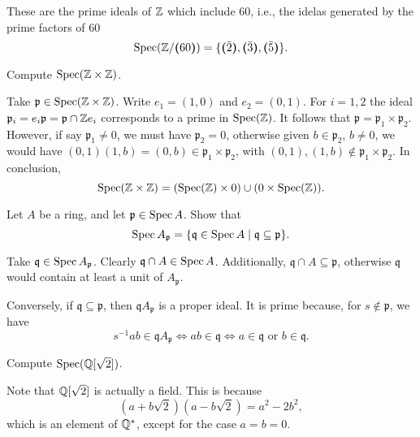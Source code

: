 \begin{solution}
    These are the prime ideals of $\mathbb{Z}$ which include $60$, i.e., the idelas generated by the prime factors of $60$
    $$
        \operatorname{Spec}(\mathbb{Z}/\textrm{\boldmath$($}60\textrm{\boldmath$)$})=\{\textrm{\boldmath$($}\bar 2\textrm{\boldmath$)$}, \textrm{\boldmath$($}\bar 3\textrm{\boldmath$)$},\textrm{\boldmath$($}\bar 5\textrm{\boldmath$)$}\}.
    $$
\end{solution}

\begin{exr}
    Compute\/ $\operatorname{Spec}(\mathbb{Z}\times\mathbb{Z})$. 
\end{exr}

\begin{solution}
    Take $\mathfrak p\in\operatorname{Spec}(\mathbb{Z}\times\mathbb{Z})$. Write $e_1=(1,0)$ and $e_2=(0,1)$. For $i=1,2$ the ideal $\mathfrak p_i=e_i\mathfrak p = \mathfrak p\cap\mathbb{Z} e_i$ corresponds to a prime in $\operatorname{Spec}(\mathbb{Z})$. It follows that $\mathfrak p=\mathfrak p_1\times\mathfrak p_2$. However, if say $\mathfrak p_1\ne0$, we must have $\mathfrak p_2=0$, otherwise given $b\in\mathfrak p_2$, $b\ne0$, we would have $(0,1)(1,b)=(0,b)\in\mathfrak p_1\times\mathfrak p_2$, with $(0,1), (1,b)\notin\mathfrak p_1\times\mathfrak p_2$. In conclusion,
    $$
        \operatorname{Spec}(\mathbb{Z}\times\mathbb{Z}) = (\operatorname{Spec}(\mathbb{Z})\times 0)\cup(0\times\operatorname{Spec}(\mathbb{Z})).
    $$
\end{solution}

\begin{exr}
    Let\/ $A$ be a ring, and let\/ $\mathfrak p \in \operatorname{Spec} A$. Show that
    $$
        \operatorname{Spec} A_{\mathfrak p} = \{\mathfrak q \in \operatorname{Spec} A
            \mid \mathfrak q \subseteq \mathfrak p\}.
    $$
\end{exr}

\begin{solution}
    Take $\mathfrak q\in\operatorname{Spec} A_{\mathfrak p}$. Clearly $\mathfrak q\cap A\in\operatorname{Spec} A$. Additionally, $\mathfrak q\cap A\subseteq\mathfrak p$, otherwise $\mathfrak q$ would contain at least a unit of $A_{\mathfrak p}$.

    Conversely, if $\mathfrak q\subseteq\mathfrak p$, then $\mathfrak qA_{\mathfrak p}$ is a proper ideal. It is prime because, for $s\notin\mathfrak p$, we have
    $$
        s^{-1}ab\in\mathfrak qA_{\mathfrak p}
            \iff ab\in\mathfrak q
            \iff a\in\mathfrak q\text{ or }b\in\mathfrak q.
    $$
\end{solution}

\begin{exr}
    Compute $\operatorname{Spec}(\mathbb{Q}[\sqrt2])$.
\end{exr}

\begin{solution}
    Note that $\mathbb{Q}[\sqrt2]$ is actually a field. This is because
    $$
        (a + b\sqrt2)(a-b\sqrt2) = a^2-2b^2,
    $$
    which is an element of $\mathbb{Q}^*$, except for the case $a=b=0$.
\end{solution}


